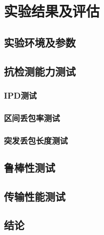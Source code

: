 \section{实验结果及评估}
\label{chap:zigzag:results}

\subsection{实验环境及参数}
\label{chap:zigzag:results:environment}

\subsection{抗检测能力测试}
\label{chap:zigzag:results:undetectability}

\subsubsection{IPD测试}
\label{chap:zigzag:results:undetectability:ipd}

\subsubsection{区间丢包率测试}
\label{chap:zigzag:results:undetectability:plr}

\subsubsection{突发丢包长度测试}
\label{chap:zigzag:results:undetectability:burst}

\subsection{鲁棒性测试}
\label{chap:zigzag:results:robustness}

\subsection{传输性能测试}
\label{chap:zigzag:results:throughput}

\subsection{结论}
\label{chap:zigzag:results:conclusion}
